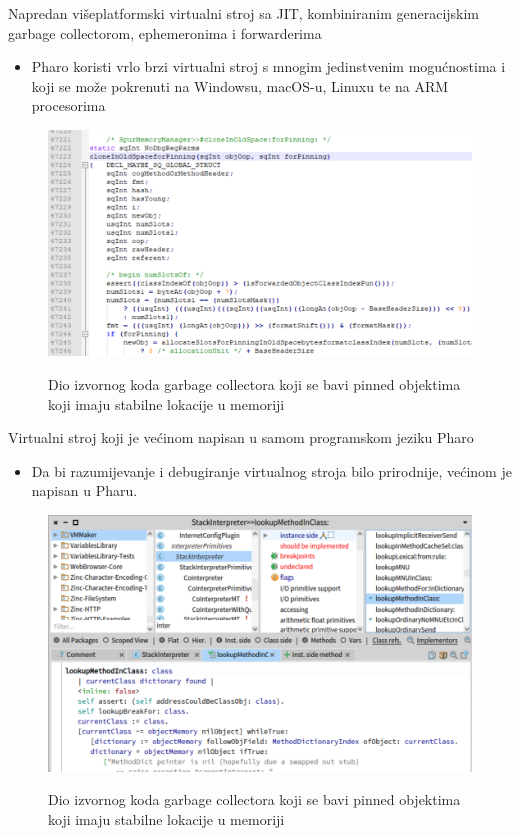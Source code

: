\documentclass{beamer}
\begin{document}
\begin{frame}{Napredan višeplatformski virtualni stroj sa JIT, kombiniranim generacijskim garbage collectorom, ephemeronima i forwarderima}
\begin{itemize}
    \item Pharo koristi vrlo brzi virtualni stroj s mnogim jedinstvenim mogućnostima i koji se može pokrenuti na Windowsu, macOS-u, Linuxu te na ARM procesorima
\end{itemize}
\begin{figure}
    \centering
    \includegraphics[width=0.8\linewidth]{vm.png}
    \label{fig:vm}
    \caption{Dio izvornog koda garbage collectora koji se bavi pinned objektima koji imaju stabilne lokacije u memoriji}
\end{figure}
\end{frame}

\begin{frame}{Virtualni stroj koji je većinom napisan u samom programskom jeziku Pharo}
\begin{itemize}
    \item Da bi razumijevanje i debugiranje virtualnog stroja bilo prirodnije, većinom je napisan u Pharu.
\end{itemize}
\begin{figure}
    \centering
    \includegraphics[width=0.8\linewidth]{vmmaker.png}
    \label{fig:vmmaker}
    \caption{Dio izvornog koda garbage collectora koji se bavi pinned objektima koji imaju stabilne lokacije u memoriji}
\end{figure}
\end{frame}
\end{document}

